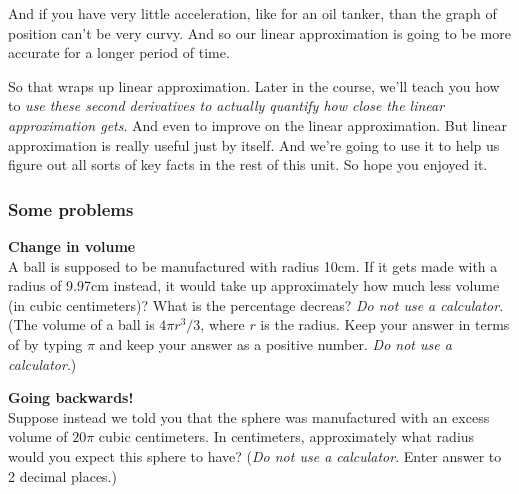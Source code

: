 \documentclass[pdftex, brazil, 12pt, twoside]{article}
\begin{document}
And if you have very little acceleration,
like for an oil tanker, than the graph of position
can't be very curvy.
And so our linear approximation is
going to be more accurate for a longer period of time.

So that wraps up linear approximation.
Later in the course, we'll teach you
how to \emph{use these second derivatives to actually
quantify how close the linear approximation gets}.
And even to improve on the linear approximation.
But linear approximation is really useful just by itself.
And we're going to use it to help
us figure out all sorts of key facts in the rest of this unit.
So hope you enjoyed it.

\subsubsection{Some problems}
\label{u2-linear-problems}

\begin{exercise}
  \textbf{Change in volume}\\%
  A ball is supposed to be manufactured with radius 10cm. If it gets made with a
  radius of 9.97cm instead, it would take up approximately how much less volume
  (in cubic centimeters)? What is the percentage decreas? \emph{Do not use a calculator}.
  (The volume of a ball is $4\pi r^3/3$, where $r$ is the radius. Keep your answer
  in terms of by typing $\pi$ and keep your answer as a positive number. \emph{Do
    not use a calculator}.)
\end{exercise}

\begin{exercise}
  \textbf{Going backwards!}\\%
  Suppose instead we told you that the sphere was manufactured with an excess
  volume of $20\pi$ cubic centimeters. In centimeters, approximately what radius
  would you expect this sphere to have? (\emph{Do not use a calculator}.
  Enter answer to 2 decimal places.)
\end{exercise}
\end{document}
